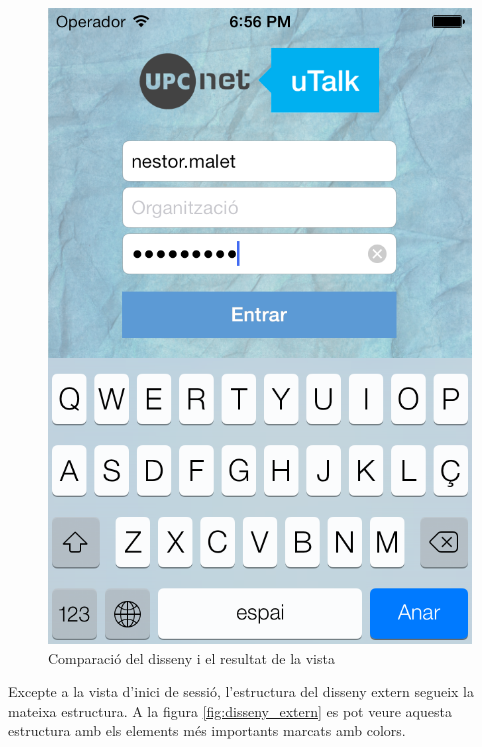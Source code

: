 \begin{figure}[ht]
\begin{minipage}[t]{.48\textwidth}
        \centering
        \includegraphics[scale=0.25]{Memoria/Implementacio/Captures/captura-login.png}
    \end{minipage}
    \caption{Comparació del disseny i el resultat de la vista}
    \label{fig:comparacio_disseny}
\end{figure}

Excepte a la vista d'inici de sessió, l'estructura del disseny extern segueix la mateixa estructura. A la figura \ref{fig:disseny_extern} es pot veure aquesta estructura amb els elements més importants marcats amb colors.


